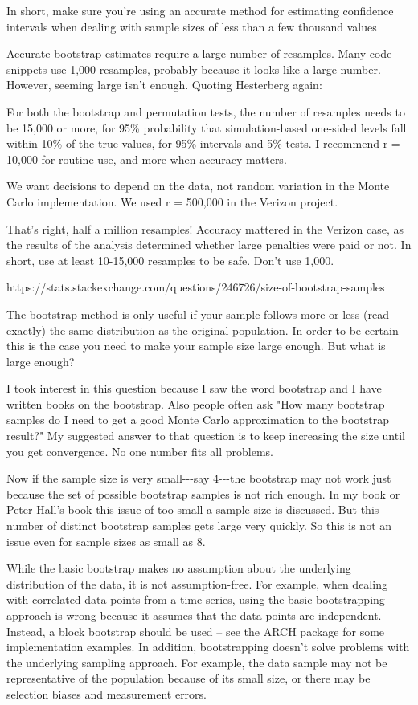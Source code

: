 \documentclass[11pt]{article}
\begin{document}
In short, make sure you're using an accurate method for estimating
confidence intervals when dealing with sample sizes of less than a few
thousand values

Accurate bootstrap estimates require a large number of resamples. Many
code snippets use 1,000 resamples, probably because it looks like a
large number. However, seeming large isn't enough. Quoting Hesterberg
again:

For both the bootstrap and permutation tests, the number of resamples
needs to be 15,000 or more, for 95\% probability that simulation-based
one-sided levels fall within 10\% of the true values, for 95\% intervals
and 5\% tests. I recommend r = 10,000 for routine use, and more when
accuracy matters.

We want decisions to depend on the data, not random variation in the
Monte Carlo implementation. We used r = 500,000 in the Verizon project.

That's right, half a million resamples! Accuracy mattered in the Verizon
case, as the results of the analysis determined whether large penalties
were paid or not. In short, use at least 10-15,000 resamples to be safe.
Don't use 1,000.

https://stats.stackexchange.com/questions/246726/size-of-bootstrap-samples

The bootstrap method is only useful if your sample follows more or less
(read exactly) the same distribution as the original population. In
order to be certain this is the case you need to make your sample size
large enough. But what is large enough?

I took interest in this question because I saw the word bootstrap and I
have written books on the bootstrap. Also people often ask "How many
bootstrap samples do I need to get a good Monte Carlo approximation to
the bootstrap result?" My suggested answer to that question is to keep
increasing the size until you get convergence. No one number fits all
problems.

Now if the sample size is very small-\/-\/-say 4-\/-\/-the bootstrap may
not work just because the set of possible bootstrap samples is not rich
enough. In my book or Peter Hall's book this issue of too small a sample
size is discussed. But this number of distinct bootstrap samples gets
large very quickly. So this is not an issue even for sample sizes as
small as 8.

While the basic bootstrap makes no assumption about the underlying
distribution of the data, it is not assumption-free. For example, when
dealing with correlated data points from a time series, using the basic
bootstrapping approach is wrong because it assumes that the data points
are independent. Instead, a block bootstrap should be used -- see the
ARCH package for some implementation examples. In addition,
bootstrapping doesn't solve problems with the underlying sampling
approach. For example, the data sample may not be representative of the
population because of its small size, or there may be selection biases
and measurement errors.
\end{document}
